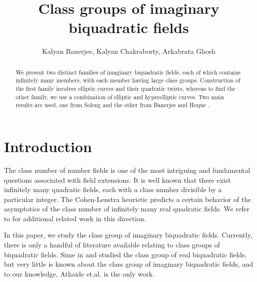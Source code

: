 \documentclass[12pt, 14paper]{amsart}
\theoremstyle{plain}
\numberwithin{equation}{section}
\begin{document}
\title{Class groups of imaginary biquadratic fields}
\author{Kalyan Banerjee,  Kalyan Chakraborty, Arkabrata Ghosh }
\address{SRM University AP}
\maketitle

\begin{abstract}
We present two distinct families of imaginary biquadratic fields, each of which contains infinitely many members, with each member having large class groups. Construction of the first family involves elliptic curves and their quadratic twists, whereas to find the other family, we use a combination of elliptic and hyperelliptic curves. Two main results are used, one from Soleng \cite{S} and the other from Banerjee and Hoque \cite{BH}.



\end{abstract}

\section{Introduction}
The class number of number fields is one of the most intriguing and fundamental questions associated with field extensions. 
It is well known that there exist infinitely many quadratic fields, each with a class number divisible by a particular integer. The Cohen-Lenstra heuristic \cite{CL} predicts a certain behavior of the asymptotics of the class number of infinitely many real
quadratic fields.  We refer to \cite{FK06} for additional related work in this direction.

In this paper, we study the class group of imaginary biquadratic fields. Currently, there is only a handful of literature available relating to class groups of biquadratic fields. 
Sime in \cite{Sim} and \cite{Sim1} studied the class group of real biquadratic fields, but very little is known about the class group of imaginary biquadratic fields, and to our knowledge, Athaide et.al.\cite{ACT} is the only work.  
\end{document}
